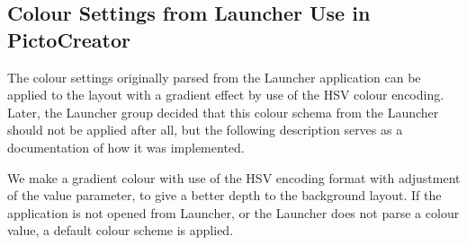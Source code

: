 \subsection{Colour Settings from Launcher Use in PictoCreator}
The colour settings originally parsed from the Launcher application can be applied to the layout with a gradient effect by use of the HSV colour encoding.
Later, the Launcher group decided that this colour schema from the Launcher should not be applied after all, but the following description serves as a documentation of how it was implemented.

We make a gradient colour with use of the HSV encoding format with adjustment of the value parameter, to give a better depth to the background layout.
If the application is not opened from Launcher, or the Launcher does not parse a colour value, a default colour scheme is applied.
